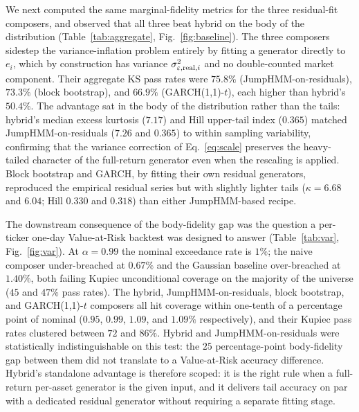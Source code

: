 We next computed the same marginal-fidelity metrics for the three
residual-fit composers, and observed that all three beat hybrid on
the body of the distribution (Table~\ref{tab:aggregate},
Fig.~\ref{fig:baseline}). The three composers sidestep the
variance-inflation problem entirely by fitting a generator directly
to $e_i$, which by construction has variance
$\sigma_{\varepsilon,\mathrm{real},i}^2$ and no double-counted market component.
Their aggregate KS pass rates were $75.8\%$
(JumpHMM-on-residuals), $73.3\%$ (block bootstrap), and $66.9\%$
(GARCH(1,1)-$t$), each higher than hybrid's $50.4\%$. The advantage
sat in the body of the distribution rather than the tails: hybrid's
median excess kurtosis ($7.17$) and Hill upper-tail index ($0.365$)
matched JumpHMM-on-residuals ($7.26$ and $0.365$) to within
sampling variability, confirming that the variance correction of
Eq.~\eqref{eq:scale} preserves the heavy-tailed character of the
full-return generator even when the rescaling is applied. Block
bootstrap and GARCH, by fitting their own residual generators,
reproduced the empirical residual series but with slightly lighter
tails ($\kappa = 6.68$ and $6.04$; Hill $0.330$ and $0.318$) than
either JumpHMM-based recipe.

The downstream consequence of the body-fidelity gap was the
question a per-ticker one-day Value-at-Risk backtest was designed to
answer (Table~\ref{tab:var}, Fig.~\ref{fig:var}). At $\alpha = 0.99$
the nominal exceedance rate is $1\%$; the naive composer
under-breached at $0.67\%$ and the Gaussian baseline over-breached
at $1.40\%$, both failing Kupiec unconditional coverage on the
majority of the universe ($45$ and $47\%$ pass rates). The hybrid,
JumpHMM-on-residuals, block bootstrap, and GARCH(1,1)-$t$ composers
all hit coverage within one-tenth of a percentage point of nominal
($0.95$, $0.99$, $1.09$, and $1.09\%$ respectively), and their
Kupiec pass rates clustered between $72$ and $86\%$. Hybrid and
JumpHMM-on-residuals were statistically indistinguishable on this
test: the $25$ percentage-point body-fidelity gap between them did not translate to
a Value-at-Risk accuracy difference. Hybrid's standalone advantage
is therefore scoped: it is the right rule when a full-return
per-asset generator is the given input, and it delivers tail
accuracy on par with a dedicated residual generator without
requiring a separate fitting stage.

